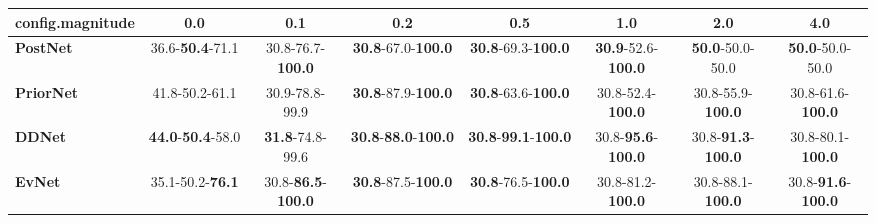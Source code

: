\begin{tabular}{lccccccc}
\toprule
\textbf{config.magnitude} &                               0.0 &                                0.1 &                                         0.2 &                                         0.5 &                                1.0 &                                2.0 &                                4.0 \\
\midrule
\textbf{PostNet } &           36.6-\textbf{50.4}-71.1 &           30.8-76.7-\textbf{100.0} &           \textbf{30.8}-67.0-\textbf{100.0} &           \textbf{30.8}-69.3-\textbf{100.0} &  \textbf{30.9}-52.6-\textbf{100.0} &            \textbf{50.0}-50.0-50.0 &            \textbf{50.0}-50.0-50.0 \\
\textbf{PriorNet} &                    41.8-50.2-61.1 &                     30.9-78.8-99.9 &           \textbf{30.8}-87.9-\textbf{100.0} &           \textbf{30.8}-63.6-\textbf{100.0} &           30.8-52.4-\textbf{100.0} &           30.8-55.9-\textbf{100.0} &           30.8-61.6-\textbf{100.0} \\
\textbf{DDNet   } &  \textbf{44.0}-\textbf{50.4}-58.0 &            \textbf{31.8}-74.8-99.6 &  \textbf{30.8}-\textbf{88.0}-\textbf{100.0} &  \textbf{30.8}-\textbf{99.1}-\textbf{100.0} &  30.8-\textbf{95.6}-\textbf{100.0} &  30.8-\textbf{91.3}-\textbf{100.0} &           30.8-80.1-\textbf{100.0} \\
\textbf{EvNet   } &           35.1-50.2-\textbf{76.1} &  30.8-\textbf{86.5}-\textbf{100.0} &           \textbf{30.8}-87.5-\textbf{100.0} &           \textbf{30.8}-76.5-\textbf{100.0} &           30.8-81.2-\textbf{100.0} &           30.8-88.1-\textbf{100.0} &  30.8-\textbf{91.6}-\textbf{100.0} \\
\bottomrule
\end{tabular}
